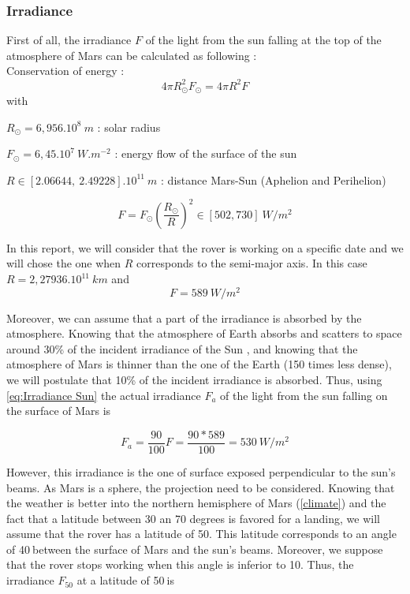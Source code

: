 \subsubsection{Irradiance}
\label{Irradiance}
First of all, the irradiance $F$ of the light from the sun falling at the top of the atmosphere of Mars can be calculated as following :\\
Conservation of energy :
\begin{equation}
\label{eq:conservation of energy}
4\pi R_\odot^2F_\odot=4\pi R^2F
\end{equation}
with 

$R_\odot=6,956.10^8\ m$ : solar radius

$F_\odot=6,45.10^7\ W.m^{-2}$ : energy flow of the surface of the sun

$R \in [2.06644,\ 2.49228].10^{11} \ m$ : distance Mars-Sun (Aphelion and Perihelion)

\begin{equation}
\label{eq:Irradiance Sun range}
F = F_\odot \left(\frac{R_\odot}{R}\right)^2 \in [502, 730]\ W/m^2
\end{equation}

In this report, we will consider that the rover is working on a specific date and we will chose the one when $R$ corresponds to the semi-major axis. In this case $R=2,27936.10^{11}\ km$ and
\begin{equation}
\label{eq:Irradiance Sun}
F = 589\ W/m^2
\end{equation}



Moreover, we can assume that a part of the irradiance is absorbed by the atmosphere. Knowing that the atmosphere of Earth absorbs and scatters to space around 30\% of the incident irradiance of the Sun \cite{yamamoto1962direct}, and knowing  that the atmosphere of Mars is thinner than the one of the Earth (150 times less dense), we will postulate that 10\% of the incident irradiance is absorbed. Thus, using \eqref{eq:Irradiance Sun} the actual irradiance $F_a$ of the light from the sun falling on the surface of Mars is

\begin{equation}
\label{eq:Actual Irradiance Sun}
F_a = \frac{90}{100}F = \frac{90*589}{100} = 530\ W/m^2
\end{equation}

However, this irradiance is the one of surface exposed perpendicular to the sun's beams. As Mars is a sphere, the projection need to be considered.
Knowing that the weather is better into the northern hemisphere of Mars (\ref{climate}) and the fact that a latitude between 30 an 70 degrees is favored for a landing\cite{latitude}, we will assume that the rover has a latitude of 50\textdegree. This latitude corresponds to an angle of 40\textdegree$\ $between the surface of Mars and the sun's beams. Moreover, we suppose that the rover stops working when this angle is inferior to 10\textdegree. Thus, the irradiance $F_{50}$ at a latitude of 50\textdegree$\ $is

